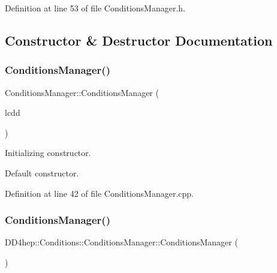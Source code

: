 Definition at line 53 of file Conditions\+Manager.\+h.



\subsection{Constructor \& Destructor Documentation}
\hypertarget{class_d_d4hep_1_1_conditions_1_1_conditions_manager_afa92512839fc9d260fc8cfa1502a5836}{}\label{class_d_d4hep_1_1_conditions_1_1_conditions_manager_afa92512839fc9d260fc8cfa1502a5836} 
\subsubsection{\texorpdfstring{Conditions\+Manager()}{ConditionsManager()}\hspace{0.1cm}{\footnotesize\ttfamily [1/5]}}
{\footnotesize\ttfamily Conditions\+Manager\+::\+Conditions\+Manager (\begin{DoxyParamCaption}\item[{\hyperlink{class_d_d4hep_1_1_geometry_1_1_l_c_d_d}{L\+C\+DD} \&}]{lcdd }\end{DoxyParamCaption})}



Initializing constructor. 

Default constructor. 

Definition at line 42 of file Conditions\+Manager.\+cpp.

\hypertarget{class_d_d4hep_1_1_conditions_1_1_conditions_manager_a5828d94a8722ba5792c0b7960d2b7175}{}\label{class_d_d4hep_1_1_conditions_1_1_conditions_manager_a5828d94a8722ba5792c0b7960d2b7175} 
\subsubsection{\texorpdfstring{Conditions\+Manager()}{ConditionsManager()}\hspace{0.1cm}{\footnotesize\ttfamily [2/5]}}
{\footnotesize\ttfamily D\+D4hep\+::\+Conditions\+::\+Conditions\+Manager\+::\+Conditions\+Manager (\begin{DoxyParamCaption}{ }\end{DoxyParamCaption})\hspace{0.3cm}{\ttfamily [default]}}



